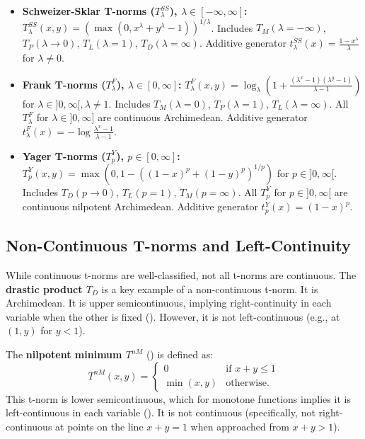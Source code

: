 \begin{example}
  \begin{itemize}
    \item \textbf{Schweizer-Sklar T-norms ($T_\lambda^{SS}$), $\lambda \in [-\infty, \infty]$:}
    $T_\lambda^{SS}(x,y) = (\max(0, x^\lambda + y^\lambda - 1))^{1/\lambda}$.
    Includes $T_M (\lambda=-\infty)$, $T_P (\lambda \to 0)$, $T_L (\lambda=1)$, $T_D (\lambda=\infty)$. Additive generator $t_\lambda^{SS}(x) = \frac{1-x^\lambda}{\lambda}$ for $\lambda \neq 0$.
    \item \textbf{Frank T-norms ($T_\lambda^F$), $\lambda \in [0, \infty]$:}
    $T_\lambda^F(x,y) = \log_\lambda \left(1 + \frac{(\lambda^x-1)(\lambda^y-1)}{\lambda-1}\right)$ for $\lambda \in ]0,\infty[, \lambda \neq 1$.
    Includes $T_M (\lambda=0)$, $T_P (\lambda=1)$, $T_L (\lambda=\infty)$. All $T_\lambda^F$ for $\lambda \in ]0,\infty]$ are continuous Archimedean. Additive generator $t_\lambda^F(x) = -\log \frac{\lambda^x-1}{\lambda-1}$.
    \item \textbf{Yager T-norms ($T_p^Y$), $p \in [0, \infty]$:} 
    $T_p^Y(x,y) = \max(0, 1 - ((1-x)^p + (1-y)^p)^{1/p})$ for $p \in ]0,\infty[$.
    Includes $T_D (p \to 0)$, $T_L (p=1)$, $T_M (p=\infty)$. All $T_p^Y$ for $p \in ]0,\infty[$ are continuous nilpotent Archimedean. Additive generator $t_p^Y(x) = (1-x)^p$.
  \end{itemize}
\end{example}

\subsection{Non-Continuous T-norms and Left-Continuity}
While continuous t-norms are well-classified, not all t-norms are continuous.
The \textbf{drastic product $T_D$} is a key example of a non-continuous t-norm. It is Archimedean. It is upper semicontinuous, implying right-continuity in each variable when the other is fixed (\cite[Rem.~1.21(i), Prop.~1.22]{Klement2000}). However, it is not left-continuous (e.g., at $(1,y)$ for $y<1$).

The \textbf{nilpotent minimum $T^{nM}$} (\cite[Rem.~1.21(i), p.~16]{Klement2000}) is defined as:
  \[
  T^{nM}(x,y) =
  \begin{cases}
    0 & \text{if } x+y \leq 1 \\
    \min(x,y) & \text{otherwise.}
  \end{cases}
  \]
This t-norm is lower semicontinuous, which for monotone functions implies it is left-continuous in each variable (\cite[Prop.~1.22, p.~17]{Klement2000}). It is not continuous (specifically, not right-continuous at points on the line $x+y=1$ when approached from $x+y>1$).

